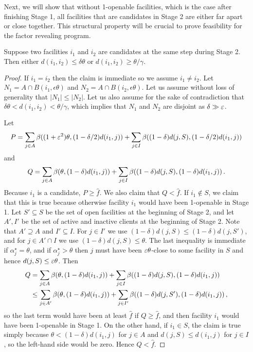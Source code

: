 Next, we will show that without 1-openable facilities, which is the case after finishing Stage 1, all facilities that are candidates in Stage 2 are either far apart or close together. This structural property will be crucial to prove feasibility for the factor revealing program.
\begin{lemma}
\label{lem:structure}
    Suppose two facilities $i_1$ and $i_2$ are candidates at the same step during Stage 2.
    Then either
    $d(i_1,i_2)\le \delta \theta$ or $d(i_1,i_2)\ge \theta / \gamma$.
\end{lemma}
\begin{proof}
If $i_1 = i_2$ then the claim is immediate so we assume $i_1 \neq i_2$.
Let $N_1 = A \cap B(i_1, \epsilon \theta)$ and $N_2 = A \cap B(i_2, \epsilon \theta)$.
Let us assume without loss of generality that $|N_1| \le |N_2|$.
Let us also assume for the sake of contradiction that $\delta \theta < d(i_1, i_2) < \theta/\gamma$, which implies that $N_1$ and $N_2$ are disjoint as $\delta \gg \varepsilon$.

Let 
\[P = \sum_{j\in A}\beta((1+\varepsilon^2) \theta, (1- \delta/2)d(i_1,j)) +
\sum_{j\in I}\beta((1-\delta)d(j,S), (1-\delta/2)d(i_1,j))\]
and 
\[Q = \sum_{j\in A}\beta(\theta, (1-\delta)d(i_1,j)) +\sum_{j\in I}\beta((1-\delta)d(j,S), (1-\delta)d(i_1,j))\,.\]
Because $i_1$ is a candidate, $P \geq \hat f$.
We also claim that $Q < \hat f$.
If $i_1 \not\in S$, we claim that this is true because otherwise facility $i_1$ would have been 1-openable in Stage 1.
Let $S' \subseteq S$ be the set of open facilities at the beginning of Stage 2, and let $A', I'$ be the set of active and inactive clients at the beginning of Stage 2.
Note that $A' \supseteq A$ and $I' \subseteq I$.
For $j \in I'$ we use $(1-\delta) d(j,S) \leq (1-\delta) d(j, S')$, and for $j \in A' \cap I$ we use $(1-\delta) d(j,S) \leq \theta$.
The last inequality is immediate if $\alpha_j^\star = \theta$, and if $\alpha_j^\star > \theta$ then $j$ must have been $\varepsilon \theta$-close to some facility in $S$ and hence $d(j,S) \leq \varepsilon\theta$.
Then
\begin{align*}
Q &= \sum_{j\in A}\beta(\theta, (1- \delta)d(i_1,j)) +
\sum_{j\in I}\beta((1-\delta)d(j,S), (1-\delta)d(i_1,j))\\
&\leq \sum_{j\in A'}\beta(\theta, (1- \delta)d(i_1,j)) +
\sum_{j\in I'}\beta((1-\delta)d(j,S'), (1-\delta)d(i_1,j))\,,
\end{align*}
so the last term would have been at least $\hat f$ if $Q \geq \hat f$, and then facility $i_1$ would have been 1-openable in Stage 1.
On the other hand, if $i_1 \in S$, the claim is true simply because $\theta < (1-\delta) d(i_1, j)$ for $j \in A$ and $d(j, S) \leq d(i_1, j)$ for $j \in I$, so the left-hand side would be zero.
Hence $Q < \hat f$.


\end{proof}
